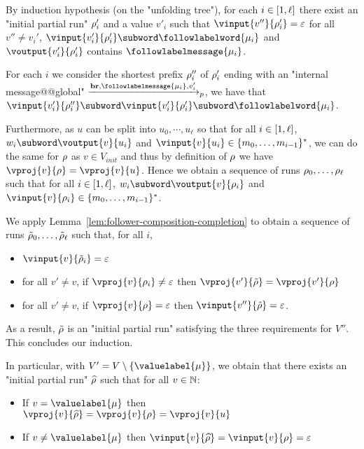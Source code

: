 By induction hypothesis (on the "unfolding tree"), for each $i \in[1,\ell]$ there exist an "initial partial run" $\rho'_i$ and a value $v'_i$ such that $\vinput{v''}{\run'_i} = \epsilon$ for all $v'' \neq v_i'$, $\vinput{v'_i}{\run'_i} \subword \followlabelword{\node_i}$ and $\voutput{v'_i}{\run'_i}$ contains $\followlabelmessage{\node_i}$.

For each $i$ we consider the shortest prefix $\rho''_i$ of $\rho'_i$ ending with an "internal message@@global" $\intmessage{\followlabelmessage{\node_i}}{v'_i}$, we have that $\vinput{v'_i}{\run''_i} \subword \vinput{v'_i}{\run'_i} \subword \followlabelword{\node_i}$.

Furthermore, as $u$ can be split into $u_0, \cdots, u_\ell$ so that for all $i \in [1,\ell]$, $w_i \subword \voutput{v}{u_i}$ and $\vinput{v}{u_i} \in \set{m_0, \ldots, m_{i-1}}^*$, we can do the same for $\rho$ as $v \in V_{init}$ and thus by definition of $\rho$ we have $\vproj{v}{\run} = \vproj{v}{u}$.
Hence we obtain a sequence of runs $\rho_0, \ldots, \rho_\ell$ such that for all $i \in [1,\ell]$, $w_i \subword \voutput{v}{\run_i}$ and $\vinput{v}{\run_i} \in \set{m_0, \ldots, m_{i-1}}^*$.

We apply Lemma~\ref{lem:follower-composition-completion} to obtain a sequence of runs $\Tilde{\rho}_0, \ldots, \Tilde{\rho}_\ell$ such that, for all $i$, 
\begin{itemize}	
	\item $\vinput{v}{\Tilde{\run}_i} = \varepsilon$ 
	
	\item for all $v' \neq v$, if $\vproj{v}{\run_i} \neq \varepsilon$ then $\vproj{v'}{\Tilde{\run}} = \vproj{v'}{\run}$
	
	\item for all $v' \neq v$, if $\vproj{v}{\run} = \varepsilon$ then $\vinput{v''}{\Tilde{\run}} = \varepsilon$.
\end{itemize}

As a result, $\Tilde{\rho}$ is an "initial partial run" satisfying the three requirements for $V''$.  This concludes our induction.

	In particular, with $V' = V\setminus \set{\valuelabel{\node}}$, we obtain that there exists an "initial partial run" $\widehat{\rho}$ such that 
for all $v \in \mathbb{N}$:
\begin{itemize}
	\item If $v = \valuelabel{\node}$ then $\vproj{v}{\widehat{\run}} = \vproj{v}{\run} = \vproj{v}{u}$
	
	\item If $v \neq \valuelabel{\node}$ then $\vinput{v}{\widehat{\run}} = \vinput{v}{\run} = \epsilon$
\end{itemize}  

